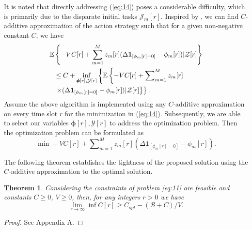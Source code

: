 \documentclass[journal]{IEEEtran}
\newtheorem{theorem}{Theorem}
\newtheorem{proof}{Proof}
\begin{document}
It is noted that directly addressing (\ref{eq:14}) poses a considerable difficulty, which is primarily due to the disparate initial tasks $\mathcal{J}_m[r]$.
Inspired by \cite{neely2012dynamic}, we can find $C$-additive approximation of the action strategy such that for a given non-negative constant $C$, we have
\begin{align}
\mathbb{E}&\left\{-VC[r]+\sum_{m=1}^Mz_m[r](\Delta {\boldsymbol 1}_{[\phi_m[r]=0]}-\phi_m[r])|\mathcal{Z}[r]\right\}\notag \\
&\leq C+\inf_{\pmb{\phi}[r],\mathcal{Y}[r]} \left\{\mathbb{E}\left\{
-VC[r]+\sum\nolimits_{m=1}^Mz_m[r]\right.\right.\notag\\
&\left.\left.\times(\Delta {\boldsymbol 1}_{[\phi_m[r]=0]}-\phi_m[r])|\mathcal{Z}[r]
\right\}
\right\}.
\end{align}
Assume the above algorithm is implemented using any $C$-additive approximation on every time slot $r$ for the minimization in (\ref{eq:14}).
Subsequently, we are able to select our variables $\pmb{\phi}[r],\mathcal{Y}[r]$ to address the optimization problem.
Then the optimization problem can be formulated as
\begin{equation}\label{eq:add}
    \min -VC[r]+\sum\nolimits_{m=1}^Mz_m[r](\Delta {\boldsymbol 1}_{[\phi_m[r]=0]}-\phi_m[r]).
\end{equation}

The following theorem establishes the tightness  of the proposed solution using the $C$-additive approximation to the optimal solution.

\begin{theorem}\label{theorem:1}
Considering the constraints of problem \eqref{eq:11} are feasible and constants $C\ge 0$, $V \ge 0$, then, for any integers $r>0$ we have
\begin{equation}
    \lim_{r \to \infty} \inf C[r] \ge C_{opt}-{(\mathcal{B}+C)}/{V}.
\end{equation}
\end{theorem}
\begin{proof}
See Appendix A.
\end{proof}
\end{document}

